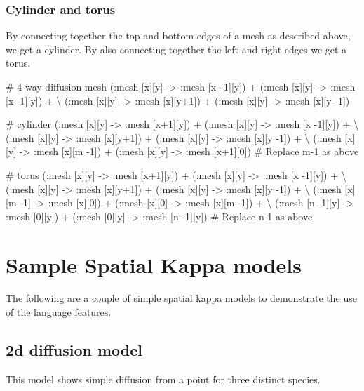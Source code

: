 \subsubsection{Cylinder and torus}

By connecting together the top and bottom edges of a mesh as described above, we get a cylinder. By also connecting together the left and right edges we get a torus.

\begin{kappasource}

# 4-way diffusion mesh
    (:mesh [x][y] -> :mesh [x+1][y]) + (:mesh [x][y] -> :mesh [x -1][y]) + {\textbackslash}
    (:mesh [x][y] -> :mesh [x][y+1]) + (:mesh [x][y] -> :mesh [x][y -1])

# cylinder
    (:mesh [x][y] -> :mesh [x+1][y]) + (:mesh [x][y] -> :mesh [x -1][y]) + {\textbackslash}
    (:mesh [x][y] -> :mesh [x][y+1]) + (:mesh [x][y] -> :mesh [x][y -1]) + {\textbackslash}
    (:mesh [x][y] -> :mesh [x][m -1]) + (:mesh [x][y] -> :mesh [x+1][0]) 
# Replace m-1 as above 

# torus
    (:mesh [x][y] -> :mesh [x+1][y]) + (:mesh [x][y] -> :mesh [x -1][y]) + {\textbackslash}
    (:mesh [x][y] -> :mesh [x][y+1]) + (:mesh [x][y] -> :mesh [x][y -1]) + {\textbackslash}
    (:mesh [x][m -1] -> :mesh [x][0]) + (:mesh [x][0] -> :mesh [x][m -1]) + {\textbackslash}
    (:mesh [n -1][y] -> :mesh [0][y]) + (:mesh [0][y] -> :mesh [n -1][y])
# Replace n-1 as above 
\end{kappasource}

\newpage
\section{Sample Spatial Kappa models}

The following are a couple of simple spatial kappa models to demonstrate the use of the language features.



\subsection{2d diffusion model}
\label{sec:2dDiffusion}

This model shows simple diffusion from a point for three distinct species.



